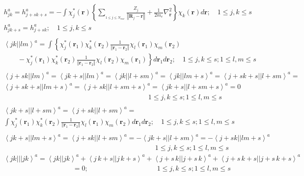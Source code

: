 \documentclass[aps,preprint]{revtex4}%
\begin{document}
\begin{align}
&  h_{jk}^{a}=h_{j+sk+s}^{a}=-\int\chi_{j}^{\ast}\left(  \mathbf{r}\right)
\left\{  \sum_{_{1\leq j\leq N_{nuc}}}\frac{Z_{j}}{\left\Vert \mathbf{R}%
_{j}-\mathbf{r}\right\Vert }+\frac{1}{2m_{e}}\nabla_{\mathbf{r}}^{2}\right\}
\chi_{k}\left(  \mathbf{r}\right)  d\mathbf{r};\quad1\leq j,k\leq s\nonumber\\
&  h_{jk+s}^{a}=h_{j+sk}^{a};\quad1\leq j,k\leq s\\
& \nonumber\\
&  \left\langle jk||lm\right\rangle ^{a}=\int\left\{  \chi_{j}^{\ast}\left(
\mathbf{r}_{1}\right)  \chi_{k}^{\ast}\left(  \mathbf{r}_{2}\right)  \frac
{1}{\left\Vert \mathbf{r}_{1}-\mathbf{r}_{2}\right\Vert }\chi_{l}\left(
\mathbf{r}_{1}\right)  \chi_{m}\left(  \mathbf{r}_{2}\right)  \right.
\nonumber\\
&  \qquad-\left.  \chi_{j}^{\ast}\left(  \mathbf{r}_{1}\right)  \chi_{k}%
^{\ast}\left(  \mathbf{r}_{2}\right)  \frac{1}{\left\Vert \mathbf{r}%
_{1}-\mathbf{r}_{2}\right\Vert }\chi_{l}\left(  \mathbf{r}_{2}\right)
\chi_{m}\left(  \mathbf{r}_{1}\right)  \right\}  d\mathbf{r}_{1}%
d\mathbf{r}_{2};\quad1\leq j,k\leq s;1\leq l,m\leq s\\
& \nonumber\\
&  \left\langle j+sk||lm\right\rangle ^{a}=\left\langle jk+s||lm\right\rangle
^{a}=\left\langle jk||l+sm\right\rangle ^{a}=\left\langle
jk||lm+s\right\rangle ^{a}=\left\langle j+sk+s||l+sm\right\rangle
^{a}=\nonumber\\
&  \left\langle j+sk+s||lm+s\right\rangle ^{a}=\left\langle
j+sk||l+sm+s\right\rangle ^{a}=\left\langle jk+s||l+sm+s\right\rangle
^{a}=0\nonumber\\
&  \left.  {}\right.  \quad\qquad\qquad\quad\qquad\qquad\quad\qquad\qquad
\quad\qquad\qquad\quad1\leq j,k\leq s;1\leq l,m\leq s\\
& \nonumber\\
&  \left\langle jk+s||l+sm\right\rangle ^{a}=\left\langle
j+sk||l+sm\right\rangle ^{a}=\nonumber\\
&  \int\chi_{j}^{\ast}\left(  \mathbf{r}_{1}\right)  \chi_{k}^{\ast}\left(
\mathbf{r}_{2}\right)  \frac{1}{\left\Vert \mathbf{r}_{1}-\mathbf{r}%
_{2}\right\Vert }\chi_{l}\left(  \mathbf{r}_{1}\right)  \chi_{m}\left(
\mathbf{r}_{2}\right)  d\mathbf{r}_{1}d\mathbf{r}_{2};\quad1\leq j,k\leq
s;1\leq l,m\leq s\\
& \nonumber\\
&  \left\langle jk+s||lm+s\right\rangle ^{a}=\left\langle
j+sk||l+sm\right\rangle ^{a}=-\left\langle jk+s||l+sm\right\rangle
^{a}=-\left\langle j+sk||lm+s\right\rangle ^{a}\nonumber\\
&  \left.  {}\right.  \quad\qquad\qquad\quad\qquad\qquad\quad\quad\qquad
\quad\qquad\qquad\qquad\quad1\leq j,k\leq s;1\leq l,m\leq s\\
&  \left\langle jk|||jk\right\rangle ^{a}=\left\langle jk||jk\right\rangle
^{a}+\left\langle j\,k+s||j\,k+s\right\rangle ^{a}+\left\langle
j+s\,k||j+s\,k\right\rangle ^{a}+\left\langle j+s\,k+s||j+s\,k+s\right\rangle
^{a}\nonumber\\
&  \left.  {}\right.  \quad\qquad\qquad\quad\qquad\qquad=0;\quad\qquad
\qquad\quad\qquad\qquad1\leq j,k\leq s;1\leq l,m\leq s
\end{align}
\end{document}
